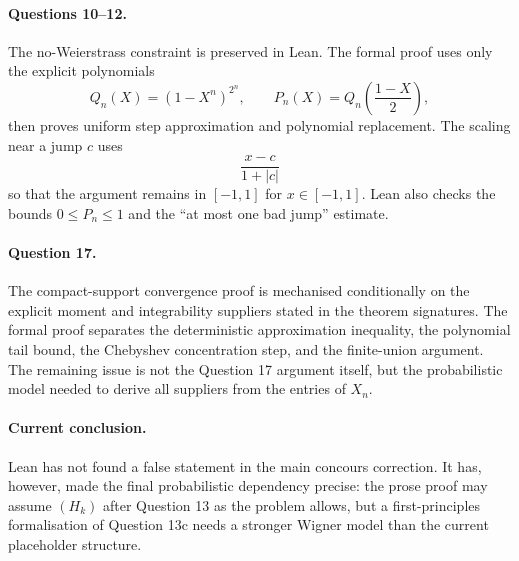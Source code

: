 \documentclass[11pt,a4paper]{article}
\begin{document}
\paragraph{Questions 10--12.}
The no-Weierstrass constraint is preserved in Lean.  The formal proof uses only
the explicit polynomials
\[
  Q_n(X)=(1-X^n)^{2^n},
  \qquad
  P_n(X)=Q_n\!\left(\frac{1-X}{2}\right),
\]
then proves uniform step approximation and polynomial replacement.  The scaling
near a jump $c$ uses
\[
  \frac{x-c}{1+|c|}
\]
so that the argument remains in $[-1,1]$ for $x\in[-1,1]$.  Lean also checks
the bounds $0\le P_n\le1$ and the ``at most one bad jump'' estimate.

\paragraph{Question 17.}
The compact-support convergence proof is mechanised conditionally on the
explicit moment and integrability suppliers stated in the theorem signatures.
The formal proof separates the deterministic approximation inequality, the
polynomial tail bound, the Chebyshev concentration step, and the finite-union
argument.  The remaining issue is not the Question 17 argument itself, but the
probabilistic model needed to derive all suppliers from the entries of
$X_n$.

\paragraph{Current conclusion.}
Lean has not found a false statement in the main concours correction.  It has,
however, made the final probabilistic dependency precise: the prose proof may
assume $(H_k)$ after Question 13 as the problem allows, but a first-principles
formalisation of Question 13c needs a stronger Wigner model than the current
placeholder structure.
\end{document}
